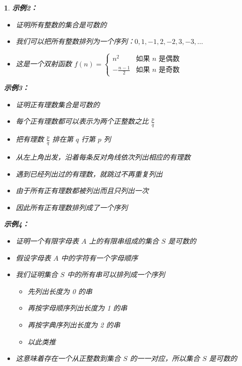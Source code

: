 \documentclass[UTF8]{report}
\theoremstyle{MyLineTheoremStyle} %
\theoremstyle{MyBlockTheoremStyle} %
\theoremstyle{MySubsubsectionStyle} %
\newtheorem{definition}{}
\begin{document}
\begin{definition}
    \textbf{示例2：}\par
    \begin{itemize}
        \item 证明所有整数的集合是可数的
        \item 我们可以把所有整数排列为一个序列：$0, 1, -1, 2, -2, 3, -3, \ldots$
        \item 这是一个双射函数 $f(n) = \begin{cases} 
            n^2 & \text{如果 } n \text{ 是偶数} \\
            -\frac{n-1}{2} & \text{如果 } n \text{ 是奇数}
        \end{cases}$
    \end{itemize}

    \textbf{示例3：}\par
    \begin{itemize}
        \item 证明正有理数集合是可数的
        \item 每个正有理数都可以表示为两个正整数之比 $\frac{p}{q}$
        \item 把有理数 $\frac{p}{q}$ 排在第 $q$ 行第 $p$ 列
        \item 从左上角出发，沿着每条反对角线依次列出相应的有理数
        \item 遇到已经列出过的有理数，就跳过不再重复列出
        \item 由于所有正有理数都被列出而且只列出一次
        \item 因此所有正有理数排列成了一个序列
    \end{itemize}

    \textbf{示例4：}\par
    \begin{itemize}
        \item 证明一个有限字母表 $A$ 上的有限串组成的集合 $S$ 是可数的
        \item 假设字母表 $A$ 中的字符有一个字母顺序
        \item 我们证明集合 $S$ 中的所有串可以排列成一个序列
        \begin{itemize}
            \item 先列出长度为 0 的串
            \item 再按字母顺序列出长度为 1 的串
            \item 再按字典序列出长度为 2 的串
            \item 以此类推
        \end{itemize}
        \item 这意味着存在一个从正整数到集合 $S$ 的一一对应，所以集合 $S$ 是可数的
    \end{itemize}


\end{definition}
\end{document}
